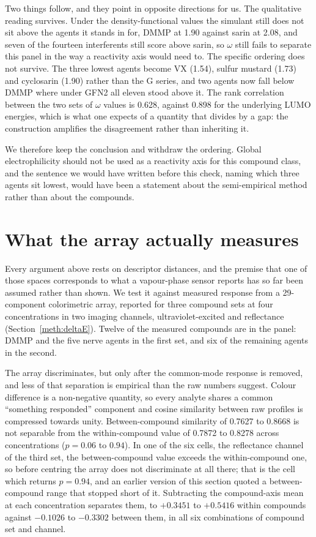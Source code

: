\documentclass[11pt,a4paper]{article}
\begin{document}
Two things follow, and they point in opposite directions for us. The qualitative
reading survives. Under the density-functional values the simulant still does
not sit above the agents it stands in for, DMMP at 1.90 against sarin at 2.08,
and seven of the fourteen interferents still score above sarin, so $\omega$
still fails to separate this panel in the way a reactivity axis would need to.
The specific ordering does not survive. The three lowest agents become VX
(1.54), sulfur mustard (1.73) and cyclosarin (1.90) rather than the G series,
and two agents now fall below DMMP where under GFN2 all eleven stood above it.
The rank correlation between the two sets of $\omega$ values is 0.628, against
0.898 for the underlying LUMO energies, which is what one expects of a quantity
that divides by a gap: the construction amplifies the disagreement rather than
inheriting it.

We therefore keep the conclusion and withdraw the ordering. Global
electrophilicity should not be used as a reactivity axis for this compound
class, and the sentence we would have written before this check, naming which
three agents sit lowest, would have been a statement about the semi-empirical
method rather than about the compounds.

\section{What the array actually measures}
\label{res:arraydetail}

Every argument above rests on descriptor distances, and the premise that one of
those spaces corresponds to what a vapour-phase sensor reports has so far been
assumed rather than shown. We test it against measured response from a
29-component colorimetric array, reported for three compound sets at four
concentrations in two imaging channels, ultraviolet-excited and reflectance
(Section~\ref{meth:deltaE}). Twelve of the measured compounds are in the panel:
DMMP and the five nerve agents in the first set, and six of the remaining agents
in the second.

The array discriminates, but only after the common-mode response is removed, and
less of that separation is empirical than the raw numbers suggest. Colour
difference is a non-negative quantity, so every analyte shares a common
``something responded'' component and cosine similarity between raw profiles is
compressed towards unity. Between-compound similarity of 0.7627 to 0.8668 is not
separable from the within-compound value of 0.7872 to 0.8278 across concentrations
($p = 0.06$ to $0.94$). In one of the six cells, the reflectance channel of the
third set, the between-compound value exceeds the within-compound one, so before
centring the array does not discriminate at all there; that is the cell which
returns $p = 0.94$, and an earlier version of this section quoted a
between-compound range that stopped short of it. Subtracting the compound-axis mean at each concentration
separates them, to $+0.3451$ to $+0.5416$ within compounds against $-0.1026$ to
$-0.3302$ between them, in all six combinations of compound set and channel.
\end{document}
